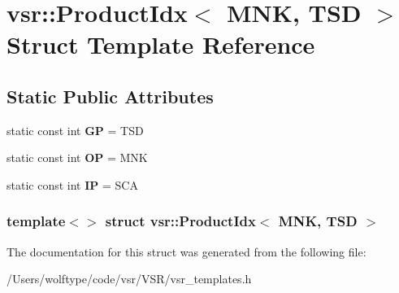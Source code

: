 \hypertarget{structvsr_1_1_product_idx_3_01_m_n_k_00_01_t_s_d_01_4}{\section{vsr\-:\-:Product\-Idx$<$ M\-N\-K, T\-S\-D $>$ Struct Template Reference}
\label{structvsr_1_1_product_idx_3_01_m_n_k_00_01_t_s_d_01_4}
}
\subsection*{Static Public Attributes}
\begin{DoxyCompactItemize}
\item 
\hypertarget{structvsr_1_1_product_idx_3_01_m_n_k_00_01_t_s_d_01_4_ab205054f59b137498499b768a3560556}{static const int {\bfseries G\-P} = T\-S\-D}\label{structvsr_1_1_product_idx_3_01_m_n_k_00_01_t_s_d_01_4_ab205054f59b137498499b768a3560556}

\item 
\hypertarget{structvsr_1_1_product_idx_3_01_m_n_k_00_01_t_s_d_01_4_ac8c4ec6806b8e448aea95ed577768255}{static const int {\bfseries O\-P} = M\-N\-K}\label{structvsr_1_1_product_idx_3_01_m_n_k_00_01_t_s_d_01_4_ac8c4ec6806b8e448aea95ed577768255}

\item 
\hypertarget{structvsr_1_1_product_idx_3_01_m_n_k_00_01_t_s_d_01_4_a817e337372a473098e53e04168ef8513}{static const int {\bfseries I\-P} = S\-C\-A}\label{structvsr_1_1_product_idx_3_01_m_n_k_00_01_t_s_d_01_4_a817e337372a473098e53e04168ef8513}

\end{DoxyCompactItemize}
\subsubsection*{template$<$$>$ struct vsr\-::\-Product\-Idx$<$ M\-N\-K, T\-S\-D $>$}



The documentation for this struct was generated from the following file\-:\begin{DoxyCompactItemize}
\item 
/\-Users/wolftype/code/vsr/\-V\-S\-R/vsr\-\_\-templates.\-h\end{DoxyCompactItemize}

